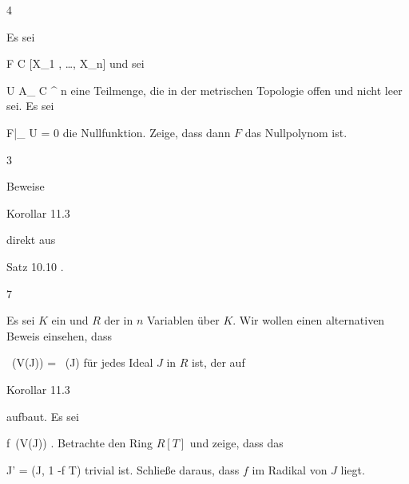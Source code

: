 
{4}
{





Es sei

\mavergleichskette
{\vergleichskette
{ F
}
{ \in }{ {\mathbb C} [X_1 , \ldots ,  X_n]
}
{  }{
}
{    }{
}
{   }{
}
}
{}{}{}
und sei

\mavergleichskette
{\vergleichskette
{ U
}
{ \subseteq }{ { {\mathbb A}_{  {\mathbb C}  }^{  n   } }
}
{  }{
}
{    }{
}
{   }{
}
}
{}{}{}
eine Teilmenge,  die in der metrischen Topologie offen und nicht leer sei. Es sei

\mavergleichskette
{\vergleichskette
{ F|_{ U}
}
{ = }{ 0
}
{  }{
}
{    }{
}
{   }{
}
}
{}{}{}
die Nullfunktion. Zeige, dass dann $F$ das Nullpolynom ist.





}
{} {}

{3}
{





Beweise

Korollar 11.3

direkt aus

Satz 10.10
.





}
{} {}

{7}
{





Es sei $K$ ein
und $R$ der
in $n$ Variablen über $K$. Wir wollen einen alternativen Beweis einsehen, dass

\mavergleichskette
{\vergleichskette
{  \, (V(J))
}
{ = }{  \, (J)
}
{  }{
}
{    }{
}
{   }{
}
}
{}{}{}
für jedes Ideal $J$ in $R$ ist, der auf

Korollar 11.3

aufbaut. Es sei

\mavergleichskette
{\vergleichskette
{ f
}
{ \in }{ \,(V(J))
}
{  }{
}
{    }{
}
{   }{
}
}
{}{}{.}
Betrachte den Ring $R[T]$ und zeige, dass das

\mavergleichskettedisp
{\vergleichskette
{ J'
}
{ =} { (J, 1 -f \cdot T)
}
{ } {
}
{ } {
}
{ } {
}
}
{}{}{}
trivial ist. Schließe daraus, dass $f$ im Radikal von $J$ liegt.





}
{} {}

